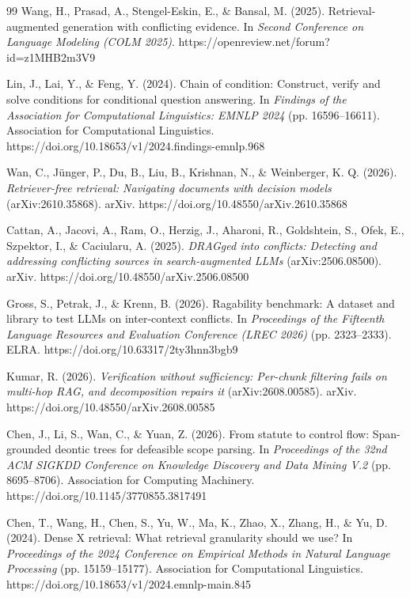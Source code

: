 \begin{thebibliography}{99}
 Wang, H., Prasad, A., Stengel-Eskin, E., \& Bansal, M. (2025). Retrieval-augmented generation with conflicting evidence. In \emph{Second Conference on Language Modeling (COLM 2025)}. https://openreview.net/forum?id=z1MHB2m3V9

 Lin, J., Lai, Y., \& Feng, Y. (2024). Chain of condition: Construct, verify and solve conditions for conditional question answering. In \emph{Findings of the Association for Computational Linguistics: EMNLP 2024} (pp. 16596--16611). Association for Computational Linguistics. https://doi.org/10.18653/v1/2024.findings-emnlp.968

 Wan, C., J{\"u}nger, P., Du, B., Liu, B., Krishnan, N., \& Weinberger, K. Q. (2026). \emph{Retriever-free retrieval: Navigating documents with decision models} (arXiv:2610.35868). arXiv. https://doi.org/10.48550/arXiv.2610.35868

 Cattan, A., Jacovi, A., Ram, O., Herzig, J., Aharoni, R., Goldshtein, S., Ofek, E., Szpektor, I., \& Caciularu, A. (2025). \emph{DRAGged into conflicts: Detecting and addressing conflicting sources in search-augmented LLMs} (arXiv:2506.08500). arXiv. https://doi.org/10.48550/arXiv.2506.08500

 Gross, S., Petrak, J., \& Krenn, B. (2026). Ragability benchmark: A dataset and library to test LLMs on inter-context conflicts. In \emph{Proceedings of the Fifteenth Language Resources and Evaluation Conference (LREC 2026)} (pp. 2323--2333). ELRA. https://doi.org/10.63317/2ty3hnn3bgb9

 Kumar, R. (2026). \emph{Verification without sufficiency: Per-chunk filtering fails on multi-hop RAG, and decomposition repairs it} (arXiv:2608.00585). arXiv. https://doi.org/10.48550/arXiv.2608.00585

 Chen, J., Li, S., Wan, C., \& Yuan, Z. (2026). From statute to control flow: Span-grounded deontic trees for defeasible scope parsing. In \emph{Proceedings of the 32nd ACM SIGKDD Conference on Knowledge Discovery and Data Mining V.2} (pp. 8695--8706). Association for Computing Machinery. https://doi.org/10.1145/3770855.3817491

 Chen, T., Wang, H., Chen, S., Yu, W., Ma, K., Zhao, X., Zhang, H., \& Yu, D. (2024). Dense X retrieval: What retrieval granularity should we use? In \emph{Proceedings of the 2024 Conference on Empirical Methods in Natural Language Processing} (pp. 15159--15177). Association for Computational Linguistics. https://doi.org/10.18653/v1/2024.emnlp-main.845


\end{thebibliography}
